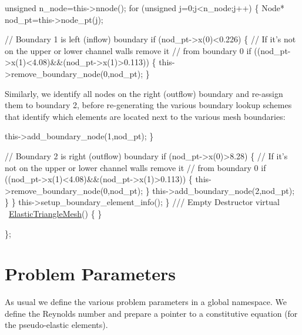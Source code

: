\begin{DoxyCodeInclude}

   \textcolor{keywordtype}{unsigned} n\_node=this->nnode();
   \textcolor{keywordflow}{for} (\textcolor{keywordtype}{unsigned} j=0;j<n\_node;j++)
    \{
     Node* nod\_pt=this->node\_pt(j);

     \textcolor{comment}{// Boundary 1 is left (inflow) boundary}
     \textcolor{keywordflow}{if} (nod\_pt->x(0)<0.226)
      \{
       \textcolor{comment}{// If it's not on the upper or lower channel walls remove it}
       \textcolor{comment}{// from boundary 0}
       \textcolor{keywordflow}{if} ((nod\_pt->x(1)<4.08)&&(nod\_pt->x(1)>0.113))
        \{
         this->remove\_boundary\_node(0,nod\_pt);
        \}

\end{DoxyCodeInclude}


Similarly, we identify all nodes on the right (outflow) boundary and re-\/assign them to boundary 2, before re-\/generating the various boundary lookup schemes that identify which elements are located next to the various mesh boundaries\+:


\begin{DoxyCodeInclude}
       this->add\_boundary\_node(1,nod\_pt);
      \}

     \textcolor{comment}{// Boundary 2 is right (outflow) boundary}
     \textcolor{keywordflow}{if} (nod\_pt->x(0)>8.28)
      \{
       \textcolor{comment}{// If it's not on the upper or lower channel walls remove it}
       \textcolor{comment}{// from boundary 0}
       \textcolor{keywordflow}{if} ((nod\_pt->x(1)<4.08)&&(nod\_pt->x(1)>0.113))
        \{
         this->remove\_boundary\_node(0,nod\_pt);
        \}
       this->add\_boundary\_node(2,nod\_pt);
      \}
    \}
   this->setup\_boundary\_element\_info();
  \}
\textcolor{comment}{}
\textcolor{comment}{ /// Empty Destructor}
\textcolor{comment}{} \textcolor{keyword}{virtual} ~\hyperlink{classElasticTriangleMesh}{ElasticTriangleMesh}() \{ \}


\};

\end{DoxyCodeInclude}




 

\hypertarget{index_namespace}{}\section{Problem Parameters}\label{index_namespace}
As usual we define the various problem parameters in a global namespace. We define the Reynolds number and prepare a pointer to a constitutive equation (for the pseudo-\/elastic elements).


